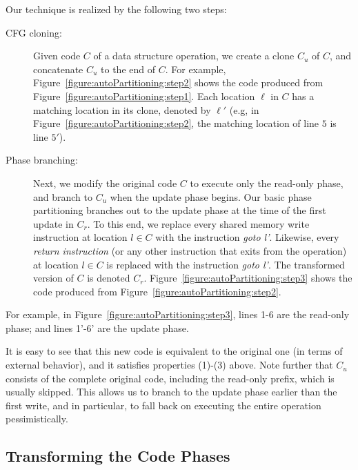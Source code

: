\noindent Our technique is realized by the following two steps:
\begin{description}
  \item [CFG cloning:]
Given code $C$ of a data structure operation, we create a clone $C_u$ of $C$, and concatenate $C_u$ to the end of $C$.
For example, Figure~\ref{figure:autoPartitioning:step2} shows the code produced from Figure~\ref{figure:autoPartitioning:step1}.
Each location $\ell$ in $C$ has a matching location in its clone, denoted by $\ell'$
(e.g, in Figure~\ref{figure:autoPartitioning:step2}, the matching location of line $5$ is line $5'$).
  \item [Phase branching:]
Next, we modify the original code $C$ to execute only the read-only phase, and branch to $C_u$ when the
update phase begins. Our basic phase partitioning branches out to the update phase at the time of the first update in $C_r$.
To this end, we replace every shared memory write instruction
at location $l \in C$ with the instruction \emph{goto l'}.
Likewise, every \emph{return instruction} (or any other instruction that exits from the operation)
at location $l \in C$ is replaced with the instruction \emph{goto l'}.
The transformed version of $C$ is denoted $C_r$.
Figure~\ref{figure:autoPartitioning:step3} shows the code produced from Figure~\ref{figure:autoPartitioning:step2}.
\end{description}


For example, in Figure~\ref{figure:autoPartitioning:step3}, lines 1-6 are the read-only phase; and lines 1'-6' are the update phase.

It is easy to see that this new code is equivalent to the original one (in terms of external behavior), and it satisfies properties (1)-(3) above. Note further that $C_u$ consists of the complete original code, including
the read-only prefix, which is usually skipped. This allows us to branch  to
the update phase earlier than the first write, and in particular, to fall back on executing the entire
operation pessimistically.


\subsection{Transforming the Code Phases}\label{ssec:transformation}

